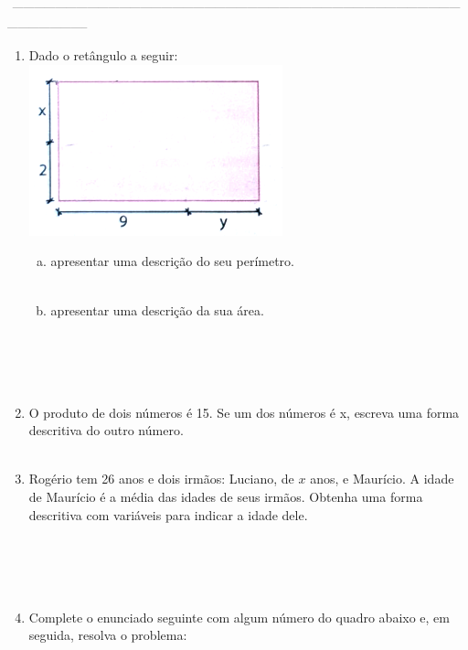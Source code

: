 \documentclass[a4paper,14pt]{article}
\begin{document}
\noindent\textsubscript{~-----------------------------------------------------------------------------------------------------------------------------------------------------}
	\begin{multicols}{2}
    	\begin{enumerate}
    		\item Dado o retângulo a seguir: \\
    		\includegraphics[width=1\linewidth]{imagens_6FMA94/imagem2}
    		\begin{enumerate}[a)]
    			\item apresentar uma descrição do seu perímetro. \\\\
    			\item apresentar uma descrição da sua área. \\\\\\\\\\
    		\end{enumerate}
    		\item O produto de dois números é 15. Se um dos números é x, escreva uma forma descritiva do outro número. \\\\
    		\item Rogério tem 26 anos e dois irmãos: Luciano, de $x$ anos, e Maurício. A idade de Maurício é a média das idades de seus irmãos. Obtenha uma forma descritiva com variáveis para indicar a idade dele. \\\\\\\\\\
    		\item Complete o enunciado seguinte com algum número do quadro abaixo e, em seguida, resolva o problema:
    		

\end{enumerate}
\end{multicols}
\end{document}
